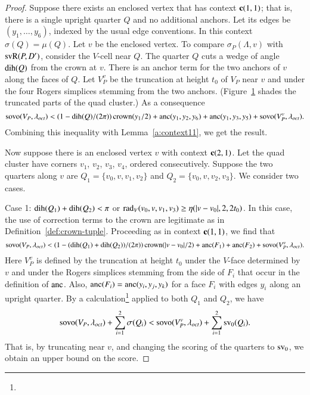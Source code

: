 \begin{proof}
%
Suppose there exists an enclosed vertex that has context
${\operatorname{\bf c}}{(1,1)}$; that is, there is a single upright quarter
$Q$ and no additional anchors.  Let its edges be
$(y_1,\ldots,y_6)$, indexed by the usual edge conventions. In this
context $\sigma(Q)=\mu(Q)$. Let $v$ be the enclosed vertex.  To
compare $\sigma_P(\Lambda,v)$ with ${\operatorname{svR}}(P,D')$, consider the $V$-cell
near $Q$. The quarter $Q$ cuts a wedge of angle $\operatorname{dih}(Q)$ from the
crown at $v$. There is an anchor term for the two anchors of $v$
along the faces of $Q$. Let $V_P^v$ be the truncation at height
$t_0$ of $V_P$ near $v$ and under the four Rogers simplices
stemming from the two anchors.
(Figure~\ref{fig:anchor-quarter-bis} shades the truncated parts of
the quad cluster.) As a consequence
\smallskip
    \begin{equation}
        {\operatorname{sovo}}(V_P,\lambda_{oct}) <(1-\operatorname{dih}(Q)/(2\pi))\operatorname{crown}(y_1/2)+\operatorname{anc}(y_1,y_2,y_6)
        +\operatorname{anc}(y_1,y_3,y_5) +{\operatorname{sovo}}(V_P^v,\lambda_{oct}).
    \label{eqn:4.8}
    \end{equation}
Combining this inequality with Lemma~\ref{a:context11}, we get the
result.


\begin{figure}[htb]
  \centering
  \caption{}
  \label{fig:anchor-quarter-bis}
\end{figure}



Now suppose there is an enclosed vertex $v$ with context
${\operatorname{\bf c}}{(2,1)}$. Let the quad cluster have corners $v_1$, $v_2$, $v_3$,
$v_4$, ordered consecutively.  Suppose the two quarters along $v$
are $Q_1=\{v_0,v,v_1,v_2\}$ and $Q_2=\{v_0,v,v_2,v_3\}$.  We consider
two cases.

\noindent Case 1:  $\operatorname{dih}(Q_1)+\operatorname{dih}(Q_2)<\pi$ or
$\operatorname{rad}_V(v_0,v,v_1,v_3)\ge\eta(|v-v_0|,2,2t_0)$. In this case, the use of
correction terms to the crown are legitimate as in
Definition~\ref{def:crown-tuple}. Proceeding as in context ${\operatorname{\bf c}}{(1,1)}$, we
find that
\smallskip
    \begin{equation}
    {\operatorname{sovo}}(V_P,\lambda_{oct}) < (1-(\operatorname{dih}(Q_1)+\operatorname{dih}(Q_2))/(2\pi))\operatorname{crown}(|v-v_0|/2)
    +\operatorname{anc}(F_1) +\operatorname{anc}(F_2) +{\operatorname{sovo}}(V_P^v,\lambda_{oct}).
    \label{eqn:4.10}
    \end{equation}
Here $V_P^v$ is defined by the truncation at height $t_0$ under the
$V$-face determined by $v$ and under the Rogers simplices stemming
from the side of $F_i$ that occur in the definition of $\operatorname{anc}$. Also,
$\operatorname{anc}(F_i)=\operatorname{anc}(y_i,y_j,y_k)$ for a face $F_i$ with edges $y_i$
along an upright quarter. By a
calculation\footnote{} applied to both $Q_1$ and
$Q_2$, we have
    \begin{equation}
    {\operatorname{sovo}}(V_P,\lambda_{oct}) +\sum_{i=1}^2\sigma(Q_i)
    < {\operatorname{sovo}}(V_P^v,\lambda_{oct}) + \sum_{i=1}^2 {\operatorname{sv}}_0(Q_i).
    \label{eqn:4.11}
    \end{equation}
That is, by truncating near $v$, and changing the scoring of the
quarters to ${\operatorname{sv}}_0$, we obtain an upper bound on the score.


\end{proof}
